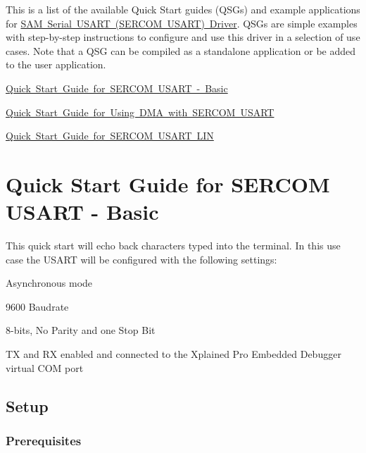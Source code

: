 This is a list of the available Quick Start guides (Q\+S\+Gs) and example applications for \mbox{\hyperlink{group__asfdoc__sam0__sercom__usart__group}{S\+AM Serial U\+S\+A\+RT (S\+E\+R\+C\+OM U\+S\+A\+RT) Driver}}. Q\+S\+Gs are simple examples with step-\/by-\/step instructions to configure and use this driver in a selection of use cases. Note that a Q\+SG can be compiled as a standalone application or be added to the user application.


\begin{DoxyItemize}
\item \mbox{\hyperlink{asfdoc_sam0_sercom_usart_basic_use_case}{Quick Start Guide for S\+E\+R\+C\+OM U\+S\+A\+RT -\/ Basic}}
\item \mbox{\hyperlink{asfdoc_sam0_sercom_usart_dma_use_case}{Quick Start Guide for Using D\+MA with S\+E\+R\+C\+OM U\+S\+A\+RT}}
\item \mbox{\hyperlink{asfdoc_sam0_sercom_usart_lin_use_case}{Quick Start Guide for S\+E\+R\+C\+OM U\+S\+A\+RT L\+IN}} 
\end{DoxyItemize}\hypertarget{asfdoc_sam0_sercom_usart_basic_use_case}{}\section{Quick Start Guide for S\+E\+R\+C\+OM U\+S\+A\+RT -\/ Basic}\label{asfdoc_sam0_sercom_usart_basic_use_case}
This quick start will echo back characters typed into the terminal. In this use case the U\+S\+A\+RT will be configured with the following settings\+:
\begin{DoxyItemize}
\item Asynchronous mode
\item 9600 Baudrate
\item 8-\/bits, No Parity and one Stop Bit
\item TX and RX enabled and connected to the Xplained Pro Embedded Debugger virtual C\+OM port
\end{DoxyItemize}\hypertarget{asfdoc_sam0_sercom_usart_basic_use_case_asfdoc_sam0_sercom_usart_basic_use_case_setup}{}\subsection{Setup}\label{asfdoc_sam0_sercom_usart_basic_use_case_asfdoc_sam0_sercom_usart_basic_use_case_setup}
\hypertarget{asfdoc_sam0_sercom_usart_basic_use_case_asfdoc_sam0_sercom_usart_basic_use_case_prereq}{}\subsubsection{Prerequisites}\label{asfdoc_sam0_sercom_usart_basic_use_case_asfdoc_sam0_sercom_usart_basic_use_case_prereq}
